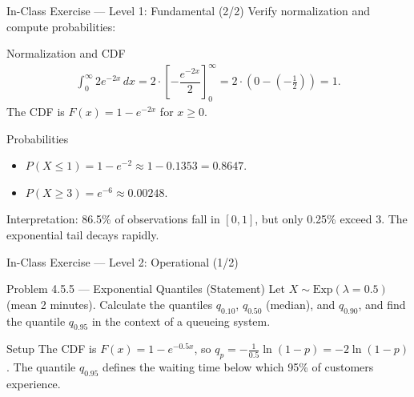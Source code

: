 \documentclass[aspectratio=169,xcolor={dvipsnames,table}]{beamer}
\begin{document}
\begin{frame}{In-Class Exercise --- Level 1: Fundamental (2/2)}
	\vspace{-0.05cm}
	\scriptsize
	Verify normalization and compute probabilities: \pause
	\begin{block}{Normalization and CDF}
		\begin{align*}
			\int_{0}^{\infty} 2e^{-2x}\,dx = 2 \cdot \left[ -\dfrac{e^{-2x}}{2} \right]_{0}^{\infty} = 2 \cdot (0 - (-\tfrac{1}{2})) = 1.
		\end{align*}
		The CDF is $F(x) = 1 - e^{-2x}$ for $x \ge 0$.
	\end{block}
	\vspace{0.05cm}
	\pause
	\begin{alertblock}{Probabilities}
		\scriptsize
		\begin{itemize}\itemsep=0.04cm
			\item $P(X \le 1) = 1 - e^{-2} \approx 1 - 0.1353 = 0.8647$.
			\item $P(X \ge 3) = e^{-6} \approx 0.00248$.
		\end{itemize}
		Interpretation: 86.5\% of observations fall in $[0, 1]$, but only 0.25\% exceed 3. The exponential tail decays rapidly.
	\end{alertblock}
\end{frame}

\begin{frame}{In-Class Exercise --- Level 2: Operational (1/2)}
	\vspace{-0.1cm}
	\begin{block}{Problem 4.5.5 --- Exponential Quantiles (Statement)}
		Let $X \sim \text{Exp}(\lambda = 0.5)$ (mean 2 minutes). Calculate the quantiles $q_{0.10}$, $q_{0.50}$ (median), and $q_{0.90}$, and find the quantile $q_{0.95}$ in the context of a queueing system.
	\end{block}
	\vspace{0.15cm}
	\pause
	\begin{alertblock}{Setup}
		\scriptsize
		The CDF is $F(x) = 1 - e^{-0.5 x}$, so $q_{p} = -\frac{1}{0.5}\ln(1-p) = -2\ln(1-p)$. The quantile $q_{0.95}$ defines the waiting time below which 95\% of customers experience.
	\end{alertblock}
\end{frame}
\end{document}
